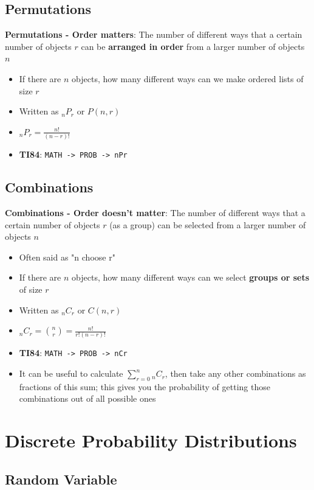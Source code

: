 \documentclass{article}
\newcommand{\code}[1]{\colorbox{light-gray}{\texttt{#1}}}
\begin{document}
\subsection{Permutations}

\textbf{Permutations - Order matters}: The number of different ways that a certain number of objects $r$ can be \textbf{arranged in order} from a larger number of objects $n$

 \begin{itemize}
    \item If there are $n$ objects, how many different ways can we make ordered lists of size $r$
    \item Written as $_nP_r$ or $P(n,r)$
    \item $_nP_r=\frac{n!}{(n-r)!}$
    \item \textbf{TI84}: \code{MATH -> PROB -> nPr}
\end{itemize}

\subsection{Combinations}

\textbf{Combinations - Order doesn't matter}: The number of different ways that a certain number of objects $r$ (as a group) can be selected from a larger number of objects $n$

\begin{itemize}
    \item Often said as "n choose r"
    \item If there are $n$ objects, how many different ways can we select \textbf{groups or sets} of size $r$
    \item Written as $_nC_r$ or $C(n,r)$
    \item $_nC_r=\binom{n}{r}=\frac{n!}{r!(n-r)!}$
    \item \textbf{TI84}: \code{MATH -> PROB -> nCr}
    \item It can be useful to calculate $\sum_{r=0}^{n}{_nC_r}$, then take any other combinations as fractions of this sum; this gives you the probability of getting those combinations out of all possible ones
\end{itemize}

\section{Discrete Probability Distributions}

\subsection{Random Variable}
\end{document}
